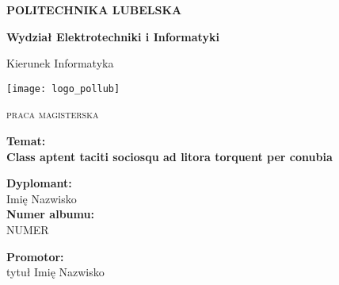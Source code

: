 \begin{titlepage}
\begin{center}

{\Huge\scshape \textbf{POLITECHNIKA LUBELSKA}}
\vspace{0.8cm}

{\LARGE \textbf{Wydział Elektrotechniki i Informatyki}}
\vspace{0.8cm}

{\LARGE Kierunek Informatyka}
\vspace{1cm}


\texttt{[image: logo\_pollub]}
\vspace{2cm}

{\LARGE\scshape praca magisterska}
\vfill

\textbf{Temat:}\\
\large\textbf{Class aptent taciti sociosqu ad litora torquent per conubia}
\end{center}
\vspace{2cm}

\begin{minipage}{0.6\textwidth}
    \textbf{Dyplomant:}\\
    Imię Nazwisko\\
    \textbf{Numer albumu:}\\
    NUMER
\end{minipage}
\begin{minipage}{0.3\textwidth}
    \textbf{Promotor:} \\
    tytuł Imię Nazwisko
\end{minipage}
 

\end{titlepage}
\clearpage
\tableofcontents
\clearpage
